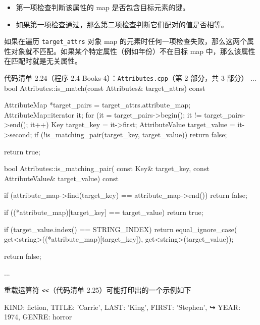 \begin{itemize}
\item 第一项检查判断该属性的 map 是否包含目标元素的键。
\item 如果第一项检查通过，那么第二项检查判断它们配对的值是否相等。
\end{itemize}

如果在遍历 \texttt{target\_\allowbreak{}attrs} 对象 map 的元素时任何一项检查失败，那么这两个属性对象就不匹配。如果某个特定属性（例如年份）不在目标 map 中，那么该属性在匹配时就是无关属性。

\begin{codeboxt}{代码清单 2.24（程序 2.4 Books-4）：\texttt{Attributes.\allowbreak{}cpp}（第 2 部分，共 3 部分）}
...
bool Attributes::is_match(const Attributes& target_attrs) const
{
    AttributeMap *target_pairs = target_attrs.attribute_map;
    AttributeMap::iterator it;
    for (it = target_pairs->begin(); it != target_pairs->end(); it++)
    {
        Key            target_key   = it->first;
        AttributeValue target_value = it->second;
        if (!is_matching_pair(target_key, target_value))
        {
            return false;
        }
    }

    return true;
}

bool Attributes::is_matching_pair(
                            const Key& target_key,
                            const AttributeValue& target_value) const
{
    if (attribute_map->find(target_key) == attribute_map->end())
    {
        return false;
    }

    if ((*attribute_map)[target_key] == target_value)
    {
        return true;
    }

    if (target_value.index() == STRING_INDEX)
    {
        return equal_ignore_case(
                        get<string>((*attribute_map)[target_key]),
                        get<string>(target_value));
    }

    return false;
}
...
\end{codeboxt}

重载运算符 \texttt{<<}（代码清单 2.25）可能打印出的一个示例如下

\begin{codebox}
{KIND: fiction, TITLE: 'Carrie', LAST: 'King', FIRST: 'Stephen', 
↪ YEAR: 1974, GENRE: horror}
\end{codebox}

